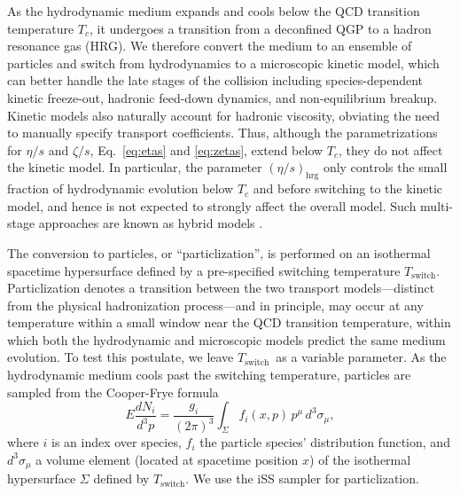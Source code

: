 \documentclass[aps,prc,reprint,amsmath,nofootinbib]{revtex4-1}
\begin{document}
As the hydrodynamic medium expands and cools below the QCD transition temperature $T_c$, it undergoes a transition from a deconfined QGP to a hadron resonance gas (HRG).
We therefore convert the medium to an ensemble of particles and switch from hydrodynamics to a microscopic kinetic model, which can better handle the late stages of the collision including species-dependent kinetic freeze-out, hadronic feed-down dynamics, and non-equilibrium breakup.
Kinetic models also naturally account for hadronic viscosity, obviating the need to manually specify transport coefficients.
Thus, although the parametrizations for $\eta/s$ and $\zeta/s$, Eq.~\eqref{eq:etas} and \eqref{eq:zetas}, extend below $T_c$, they do not affect the kinetic model.
In particular, the parameter $(\eta/s)_\text{hrg}$ only controls the small fraction of hydrodynamic evolution below $T_c$ and before switching to the kinetic model, and hence is not expected to strongly affect the overall model.
Such multi-stage approaches are known as hybrid models \cite{Bass:2000ib, Nonaka:2006yn, Petersen:2008dd}.

\newcommand{\Tsw}{$T_\text{switch}$}

The conversion to particles, or ``particlization'', is performed on an isothermal spacetime hypersurface defined by a pre-specified switching temperature \Tsw.
Particlization denotes a transition between the two transport models---distinct from the physical hadronization process---and in principle, may occur at any temperature within a small window near the QCD transition temperature, within which both the hydrodynamic and microscopic models predict the same medium evolution.
To test this postulate, we leave \Tsw\ as a variable parameter.
As the hydrodynamic medium cools past the switching temperature, particles are sampled from the Cooper-Frye formula \cite{Cooper:1974mv}
\begin{equation}
  E \frac{dN_i}{d^3p} =
    \frac{g_i}{(2\pi)^3} \int_\Sigma f_i(x,p) \, p^\mu \, d^3\sigma_\mu,
  \label{eq:cooper_frye}
\end{equation}
where $i$ is an index over species, $f_i$ the particle species' distribution function, and $d^3\sigma_\mu$ a volume element (located at spacetime position $x$) of the isothermal hypersurface $\Sigma$ defined by \Tsw.
We use the iSS sampler \cite{Shen:2014vra, Qiu:2013wca} for particlization.

\newcommand{\df}{\delta f}
\end{document}
